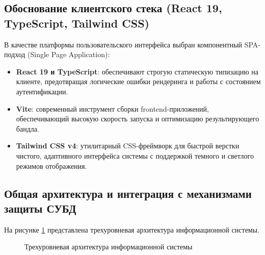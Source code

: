 \documentclass[a4paper,14pt]{article}
\begin{document}
\subsection{Обоснование клиентского стека (React 19, TypeScript, Tailwind CSS)}
В качестве платформы пользовательского интерфейса выбран компонентный SPA-подход (Single Page Application):
\begin{itemize}
    \item \textbf{React 19 и TypeScript}: обеспечивают строгую статическую типизацию на клиенте, предотвращая логические ошибки рендеринга и работы с состоянием аутентификации.
    \item \textbf{Vite}: современный инструмент сборки frontend-приложений, обеспечивающий высокую скорость запуска и оптимизацию результирующего бандла.
    \item \textbf{Tailwind CSS v4}: утилитарный CSS-фреймворк для быстрой верстки чистого, адаптивного интерфейса системы с поддержкой темного и светлого режимов отображения.
\end{itemize}

\subsection{Общая архитектура и интеграция с механизмами защиты СУБД}
На рисунке \ref{fig:arch_scheme} представлена трехуровневая архитектура информационной системы.

\begin{figure}[h!]
    \centering
    \caption{Трехуровневая архитектура информационной системы}
    \label{fig:arch_scheme}
\end{figure}
\end{document}
